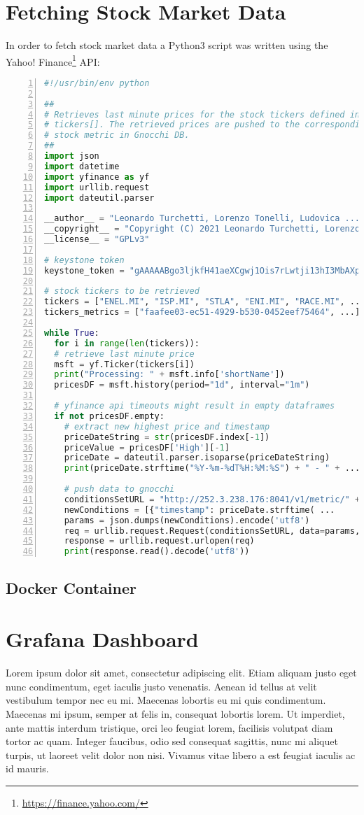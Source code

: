 \documentclass[11pt,a4paper]{article}
\begin{document}
\section{Fetching Stock Market Data}
In order to fetch stock market data a Python3 script was written using the Yahoo! Finance\footnote{\url{https://finance.yahoo.com/}} API:
\begin{lstlisting}[language=python,caption={fetch\_stock\_prices.py},numbers=left]
#!/usr/bin/env python

##
# Retrieves last minute prices for the stock tickers defined in
# tickers[]. The retrieved prices are pushed to the corresponding
# stock metric in Gnocchi DB.
##
import json
import datetime
import yfinance as yf
import urllib.request
import dateutil.parser

__author__ = "Leonardo Turchetti, Lorenzo Tonelli, Ludovica ..."
__copyright__ = "Copyright (C) 2021 Leonardo Turchetti, Lorenzo ..."
__license__ = "GPLv3"

# keystone token
keystone_token = "gAAAAABgo3ljkfH41aeXCgwj1Ois7rLwtji13hI3MbAXpJ..."

# stock tickers to be retrieved
tickers = ["ENEL.MI", "ISP.MI", "STLA", "ENI.MI", "RACE.MI", ...];
tickers_metrics = ["faafee03-ec51-4929-b530-0452eef75464", ...]

while True:
  for i in range(len(tickers)):
  # retrieve last minute price
  msft = yf.Ticker(tickers[i])
  print("Processing: " + msft.info['shortName'])
  pricesDF = msft.history(period="1d", interval="1m")

  # yfinance api timeouts might result in empty dataframes
  if not pricesDF.empty:
    # extract new highest price and timestamp
    priceDateString = str(pricesDF.index[-1])
    priceValue = pricesDF['High'][-1]
    priceDate = dateutil.parser.isoparse(priceDateString)
    print(priceDate.strftime("%Y-%m-%dT%H:%M:%S") + " - " + ...)

    # push data to gnocchi
    conditionsSetURL = "http://252.3.238.176:8041/v1/metric/" + ...
    newConditions = [{"timestamp": priceDate.strftime( ...
    params = json.dumps(newConditions).encode('utf8')
    req = urllib.request.Request(conditionsSetURL, data=params, ...
    response = urllib.request.urlopen(req)
    print(response.read().decode('utf8'))
\end{lstlisting}
\subsection{Docker Container}
\section{Grafana Dashboard}
Lorem ipsum dolor sit amet, consectetur adipiscing elit. Etiam aliquam justo eget nunc condimentum, eget iaculis justo venenatis. Aenean id tellus at velit vestibulum tempor nec eu mi. Maecenas lobortis eu mi quis condimentum. Maecenas mi ipsum, semper at felis in, consequat lobortis lorem. Ut imperdiet, ante mattis interdum tristique, orci leo feugiat lorem, facilisis volutpat diam tortor ac quam. Integer faucibus, odio sed consequat sagittis, nunc mi aliquet turpis, ut laoreet velit dolor non nisi. Vivamus vitae libero a est feugiat iaculis ac id mauris.
\end{document}
